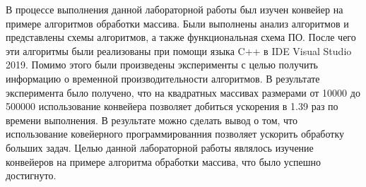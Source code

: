 \Conclusion
В процессе выполнения данной лабораторной работы был изучен конвейер на примере алгоритмов обработки массива. Были выполнены анализ алгоритмов и представлены схемы алгоритмов, а также функциональная схема ПО. После чего эти алгоритмы были реализованы при помощи языка C++ в IDE Visual Studio 2019. Помимо этого были произведены эксперименты с целью получить информацию о временной производительности алгоритмов. В результате эксперимента было получено, что на квадратных массивах размерами от 10000 до 500000 использование конвейера позволяет добиться ускорения в 1.39 раз по времени выполнения. В результате можно сделать вывод о том, что использование ковейерного программированния позволяет ускорить обработку больших задач. Целью данной лабораторной работы являлось изучение конвейеров на примере алгоритма обработки массива, что было успешно достигнуто.